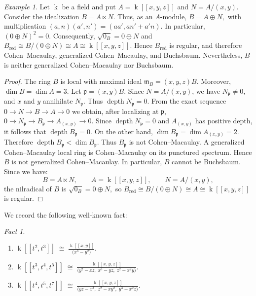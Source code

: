 \documentclass[10pt,a4paper]{amsart}
\theoremstyle{definition}
\theoremstyle{remark}
\newtheorem{example}[theorem]{Example}
\newtheorem{fact}[theorem]{Fact}
\newcommand{\kk}{\operatorname{k}}
\begin{document}
\begin{example}
	Let \(\kk\) be a field and put
 $
	A=\kk[[x,y,z]]
	$ 	and
 $
	N=A/(x,y).
	$ 	Consider the idealization
 $
	B=A\ltimes N.
	$ Thus, as an \(A\)-module,
 $
	B=A\oplus N,
 $
 with multiplication
 $
	(a,n)(a',n')=(aa',an'+a'n).
 $
 In particular,
 $
	(0\oplus N)^2=0.
 $
 	Consequently,
 $
	\sqrt{0_B}=0\oplus N
	$ 
and
 $
	B_{\mathrm{red}}
	\cong B/(0\oplus N)
	\cong A
	\cong \kk[[x,y,z]].
	$ Hence \(B_{\mathrm{red}}\) is regular, and therefore Cohen--Macaulay,
	generalized Cohen--Macaulay, and Buchsbaum.
 Nevertheless, \(B\) is neither generalized Cohen--Macaulay nor
	Buchsbaum.
\end{example}

\begin{proof}
	The ring \(B\) is local with maximal ideal
 $
	\mathfrak m_B=(x,y,z)B.
 $
 	Moreover,
 $
	\dim B=\dim A=3.
	$ 	Let
 $
	\mathfrak p=(x,y)B.
	$ 	Since \(N=A/(x,y)\), we have
 $
	N_{\mathfrak p}\neq 0,
 $
 and \(x\) and \(y\) annihilate \(N_{\mathfrak p}\). Thus
 $
	\operatorname{depth}N_{\mathfrak p}=0.
	$ 	From the exact sequence
 $
	0\to N\to B\to A\to0
	$ we obtain, after localizing at \(\mathfrak p\),
$
	0\to N_{\mathfrak p}
	\to B_{\mathfrak p}
	\to A_{(x,y)}
	\to0.
	$ Since
 $
	\operatorname{depth}N_{\mathfrak p}=0
 $
 and \(A_{(x,y)}\) has positive depth, it follows that
 $
	\operatorname{depth}B_{\mathfrak p}=0.
	$ On the other hand,
 $
	\dim B_{\mathfrak p}
	=
	\dim A_{(x,y)}
	=
	2.
	$ 
 Therefore
  $
	\operatorname{depth}B_{\mathfrak p}
	<
	\dim B_{\mathfrak p}.
	$ 
	Thus \(B_{\mathfrak p}\) is not Cohen--Macaulay.
 A generalized Cohen--Macaulay local ring is Cohen--Macaulay on its
	punctured spectrum. Hence \(B\) is not generalized Cohen--Macaulay.
	In particular, \(B\) cannot be Buchsbaum.
  Since we have:
	\[
	B=A\ltimes N,\qquad A=\kk[[x,y,z]],\qquad N=A/(x,y),
	\]
the nilradical of \(B\) is
	\(
	\sqrt{0_B}=0\oplus N,
	\)
	so
	\(
	B_{\mathrm{red}}
	\cong B/(0\oplus N)
	\cong A
	\cong \kk[[x,y,z]] 
	\)
	 is  regular.
 \end{proof}
We record the following well-known fact:

\begin{fact}\label{rel} 	\begin{enumerate}
\item[(i)] \(\kk[[t^2,t^3]] \;\cong\; \frac{\kk[[x,y]]}{\bigl(x^3-y^2 \bigr)}\).
\item[(ii)] 
\(\kk[[t^3,t^4,t^5]] \;\cong\; \frac{\kk[[x,y,z]]}{\bigl(y^2 - xz,\; x^3 - yz,\; z^2 - x^2 y\bigr)}\).
\item[(iii)]
\(\kk[[t^4,t^5,t^7]] \;\cong\; \frac{\kk[[x,y,z]]}{\bigl(yz - x^3,\; z^2 - xy^2,\; y^3 - x^2 z\bigr)}\).
 		\end{enumerate}

 	\end{fact}
\end{document}
